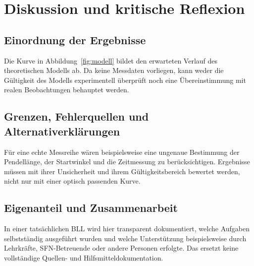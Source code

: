 \chapter{Diskussion und kritische Reflexion}
\label{ch:diskussion}

\section{Einordnung der Ergebnisse}
Die Kurve in Abbildung~\ref{fig:modell} bildet den erwarteten Verlauf
des theoretischen Modells ab. Da keine Messdaten vorliegen, kann weder
die Gültigkeit des Modells experimentell überprüft noch eine
Übereinstimmung mit realen Beobachtungen behauptet werden.

\section{Grenzen, Fehlerquellen und Alternativerklärungen}
Für eine echte Messreihe wären beispielsweise eine ungenaue Bestimmung
der Pendellänge, der Startwinkel und die Zeitmessung zu berücksichtigen.
Ergebnisse müssen mit ihrer Unsicherheit und ihrem Gültigkeitsbereich
bewertet werden, nicht nur mit einer optisch passenden Kurve.

\section{Eigenanteil und Zusammenarbeit}
In einer tatsächlichen BLL wird hier transparent dokumentiert,
welche Aufgaben selbstständig ausgeführt wurden und welche Unterstützung
beispielsweise durch Lehrkräfte, SFN-Betreuende oder andere Personen
erfolgte. Das ersetzt keine vollständige Quellen- und
Hilfsmitteldokumentation.
